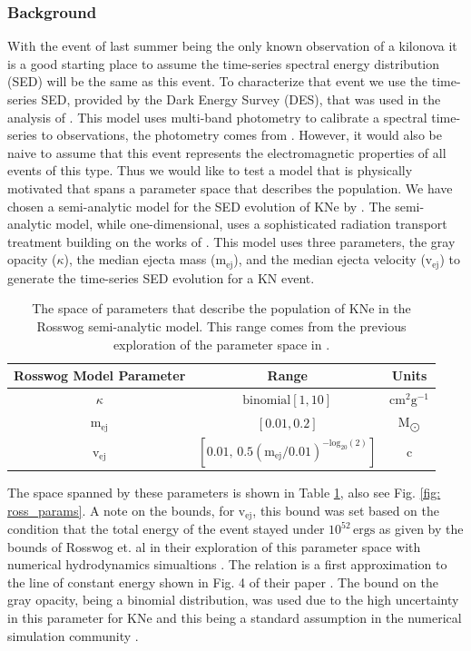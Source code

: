 \subsubsection{Background}
With the event of last summer being the only known observation of a kilonova it is a good starting place to assume the time-series spectral energy distribution (SED) will be the same as this event. To characterize that event we use the time-series SED, provided by the Dark Energy Survey (DES), that was used in the analysis of \citep{Scolnic2017a}. This model uses multi-band photometry to calibrate a spectral time-series to observations, the photometry comes from \citep{Soares-Santos2017, Cowperthwaite2017}. However, it would also be naive to assume that this event represents the electromagnetic properties of all events of this type. Thus we would like to test a model that is physically motivated that spans a parameter space that describes the population. We have chosen a semi-analytic model for the SED evolution of KNe by \citep{Rosswog2018}. The semi-analytic model, while one-dimensional, uses a sophisticated radiation transport treatment building on the works of \citep{Wollaeger2017, Pinto2000}. This model uses three parameters, the gray opacity ($\kappa$), the median ejecta mass ($\mathrm{m_{ej}}$), and the median ejecta velocity ($\mathrm{v_{ej}}$) to generate the time-series SED evolution for a KN event. \par
\begin{table}[h!]
  \centering
  \begin{tabular}{c|c|c}
    Rosswog Model Parameter & Range & Units \\
    \hline
    $\kappa$ & $\mathrm{binomial}[1, 10]$ & $\mathrm{cm^2 g^{-1}}$ \\
    \hline
    $\mathrm{m_{ej}}$ & $[0.01, 0.2]$ & $\mathrm{M_{\bigodot}}$ \\
    \hline
    $\mathrm{v_{ej}}$ & $[0.01, \, 0.5 (\mathrm{m_{ej}}/0.01)^{-\mathrm{log}_{20}(2)}]$ & c
  \end{tabular}
  \caption{The space of parameters that describe the population of KNe in the Rosswog semi-analytic model. This range comes from the previous exploration of the parameter space in \citep{Rosswog2016a}.}
  \label{tab: ross_params}
\end{table}

The space spanned by these parameters is shown in Table \ref{tab: ross_params}, also see Fig. \ref{fig: ross_params}. A note on the bounds, for $\mathrm{v_{ej}}$, this bound was set based on the condition that the total energy of the event stayed under $10^{52}\, \mathrm{ergs}$ as given by the bounds of Rosswog et. al in their exploration of this parameter space with numerical hydrodynamics simualtions \citep{Rosswog2016a}. The relation is a first approximation to the line of constant energy shown in Fig. 4 of their paper \citep{Rosswog2016a}. The bound on the gray opacity, being a binomial distribution, was used due to the high uncertainty in this parameter for KNe \citep{Kasen2013} and this being a standard assumption in the numerical simulation community \citep{Rosswog2018}.\par

